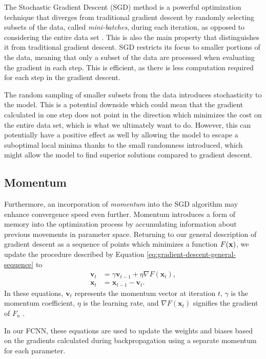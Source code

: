 \documentclass[a4paper, UKenglish, 11pt]{uiomaster}
\begin{document}
The Stochastic Gradient Descent (SGD) method is a powerful optimization technique that diverges from traditional gradient descent by randomly selecting subsets of the data, called \emph{mini-batches}, during each iteration, as opposed to considering the entire data set \cite{bishop2006pattern}. This is also the main property that distinguishes it from traditional gradient descent. SGD restricts its focus to smaller portions of the data, meaning that only a subset of the data are processed when evaluating the gradient in each step.
This is efficient, as there is less computation required for each step in the gradient descent.

The random sampling of smaller subsets from the data introduces stochasticity to the model. This is a potential downside which could mean that the gradient calculated in one step does not point in the direction which minimizes the cost on the entire data set, which is what we ultimately want to do. However, this can potentially have a positive effect as well by allowing the model to escape a suboptimal local minima thanks to the small randomness introduced, which might allow the model to find superior solutions compared to gradient descent.



\subsection{Momentum}

Furthermore, an incorporation of \emph{momentum} into the SGD algorithm may enhance convergence speed even further. Momentum introduces a form of memory into the optimization process by accumulating information about previous movements in parameter space. Returning to our general description of gradient descent as a sequence of points which minimizes a function
\(F(\textbf x)\),
we update the procedure described by Equation
\eqref{eq:gradient-descent-general-sequence}
to
\begin{align}
  \textbf{v}_t &= \gamma \textbf{v}_{t-1} + \eta \nabla F(\textbf{x}_t), \\
  \textbf{x}_t &= \textbf{x}_{t-1} - \textbf{v}_{t}.
\end{align}
In these equations, $\textbf{v}_t$ represents the momentum vector at iteration $t$, $\gamma$ is the momentum coefficient, $\eta$ is the learning rate, and $\nabla F(\textbf{x}_t)$ signifies the gradient of $F_n$ \cite{Hjorth-Jensen2022}.

In our FCNN, these equations are used to update the weights and biases based on the gradients calculated during backpropagation using a separate momentum for each parameter.
\end{document}
